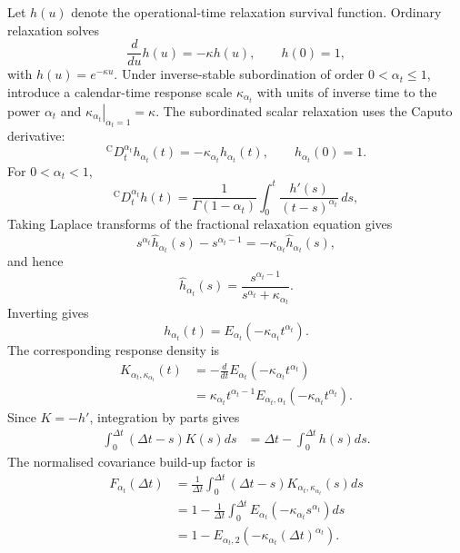 \documentclass[5p,final]{elsarticle}
\begin{document}
Let $h(u)$ denote the operational-time relaxation survival function. Ordinary relaxation solves
\begin{equation}
    \frac{d}{du}h(u)=-\kappa h(u),
    \qquad h(0)=1,
\end{equation}
with $h(u)=e^{-\kappa u}$. Under inverse-stable subordination of order $0<\alpha_t\leq1$, introduce a calendar-time response scale $\kappa_{\alpha_t}$ with units of inverse time to the power $\alpha_t$ and $\left.\kappa_{\alpha_t}\right|_{\alpha_t=1}=\kappa$. The subordinated scalar relaxation uses the Caputo derivative:
\begin{equation}
    {}^{\mathrm C}D_t^{\alpha_t}h_{\alpha_t}(t)
    =-\kappa_{\alpha_t}h_{\alpha_t}(t),
    \qquad h_{\alpha_t}(0)=1.
\end{equation}
For $0<\alpha_t<1$,
\begin{equation}
    {}^{\mathrm C}D_t^{\alpha_t}h(t)
    =\frac{1}{\Gamma(1-\alpha_t)}
    \int_0^t\frac{h'(s)}{(t-s)^{\alpha_t}}\,ds,
\end{equation}
Taking Laplace transforms of the fractional relaxation equation gives
\begin{equation}
    s^{\alpha_t}\widehat h_{\alpha_t}(s)-s^{\alpha_t-1}
    =-\kappa_{\alpha_t}\widehat h_{\alpha_t}(s),
\end{equation}
and hence
\begin{equation}
    \widehat h_{\alpha_t}(s)
    =\frac{s^{\alpha_t-1}}
    {s^{\alpha_t}+\kappa_{\alpha_t}}.
\end{equation}
Inverting gives
\begin{equation}
    h_{\alpha_t}(t)=E_{\alpha_t}(-\kappa_{\alpha_t}t^{\alpha_t}).
\end{equation}
The corresponding response density is
\begin{align}
    K_{\alpha_t,\kappa_{\alpha_t}}(t)
    &=-\frac{d}{dt}E_{\alpha_t}
    (-\kappa_{\alpha_t}t^{\alpha_t})\\
    &=\kappa_{\alpha_t}t^{\alpha_t-1}
    E_{\alpha_t,\alpha_t}
    (-\kappa_{\alpha_t}t^{\alpha_t}).
\end{align}
Since $K=-h'$, integration by parts gives
\begin{align}
    \int_0^{\Delta t}(\Delta t-s)K(s)ds
    &=\Delta t-\int_0^{\Delta t}h(s)ds.
\end{align}
The normalised covariance build-up factor is
\begin{align}
    F_{\alpha_t}(\Delta t)
    &=\frac{1}{\Delta t}\int_0^{\Delta t}(\Delta t-s)
    K_{\alpha_t,\kappa_{\alpha_t}}(s)ds\\
    &=1-\frac{1}{\Delta t}\int_0^{\Delta t}
    E_{\alpha_t}(-\kappa_{\alpha_t}s^{\alpha_t})ds\\
    &=1-E_{\alpha_t,2}(-\kappa_{\alpha_t}(\Delta t)^{\alpha_t}).
\end{align}
\end{document}
